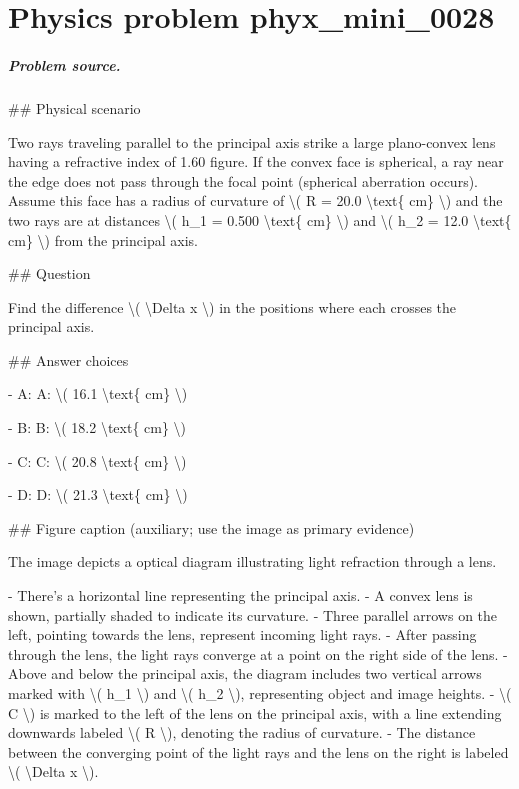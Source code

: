 
\chapter{Physics problem phyx\_mini\_0028}
\label{ch:PhyXMiniProblems_problem_phyx_mini_0028}

\paragraph{Problem source.}
\#\# Physical scenario

Two rays traveling parallel to the principal axis strike a large plano-convex lens having a refractive index of 1.60 figure. If the convex face is spherical, a ray near the edge does not pass through the focal point (spherical aberration occurs). Assume this face has a radius of curvature of \textbackslash{}( R = 20.0 \textbackslash{}text\{ cm\} \textbackslash{}) and the two rays are at distances \textbackslash{}( h\_1 = 0.500 \textbackslash{}text\{ cm\} \textbackslash{}) and \textbackslash{}( h\_2 = 12.0 \textbackslash{}text\{ cm\} \textbackslash{}) from the principal axis.

\#\# Question

Find the difference \textbackslash{}( \textbackslash{}Delta x \textbackslash{}) in the positions where each crosses the principal axis.

\#\# Answer choices

- A: A: \textbackslash{}( 16.1 \textbackslash{}text\{ cm\} \textbackslash{})

- B: B: \textbackslash{}( 18.2 \textbackslash{}text\{ cm\} \textbackslash{})

- C: C: \textbackslash{}( 20.8 \textbackslash{}text\{ cm\} \textbackslash{})

- D: D: \textbackslash{}( 21.3 \textbackslash{}text\{ cm\} \textbackslash{})

\#\# Figure caption (auxiliary; use the image as primary evidence)

The image depicts a optical diagram illustrating light refraction through a lens.

- There's a horizontal line representing the principal axis.
- A convex lens is shown, partially shaded to indicate its curvature.
- Three parallel arrows on the left, pointing towards the lens, represent incoming light rays.
- After passing through the lens, the light rays converge at a point on the right side of the lens.
- Above and below the principal axis, the diagram includes two vertical arrows marked with \textbackslash{}( h\_1 \textbackslash{}) and \textbackslash{}( h\_2 \textbackslash{}), representing object and image heights.
- \textbackslash{}( C \textbackslash{}) is marked to the left of the lens on the principal axis, with a line extending downwards labeled \textbackslash{}( R \textbackslash{}), denoting the radius of curvature.
- The distance between the converging point of the light rays and the lens on the right is labeled \textbackslash{}( \textbackslash{}Delta x \textbackslash{}).

